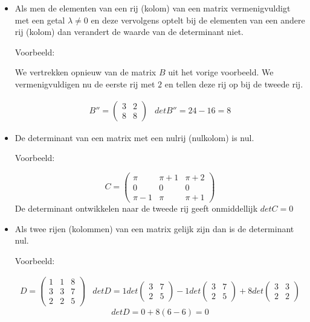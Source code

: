 \begin{itemize}
	\item Als men de elementen van een rij (kolom) van een matrix vermenigvuldigt met een getal $\lambda \neq 0$ en deze vervolgens optelt bij de elementen van een andere rij (kolom) dan verandert de waarde van de determinant niet. 
	
	Voorbeeld:
	
	We vertrekken opnieuw van de matrix $B$ uit het vorige voorbeeld. We vermenigvuldigen nu de eerste rij met $2$ en tellen deze rij op bij de tweede rij.
	
	\[ \begin{array}{ll} B''=\left( \begin{matrix}
	3 & 2 \\ 8 & 8 
	\end{matrix} \right) & det B''=24-16=8 \end{array} \]
	
	\item De determinant van een matrix met een nulrij (nulkolom) is nul.
	
	Voorbeeld:
	
	\[ C=\left( \begin{matrix}
	\pi & \pi+1 & \pi+2 \\ 0 & 0 & 0 \\ \pi-1 & \pi & \pi+1
	\end{matrix} \right) \]
	De determinant ontwikkelen naar de tweede rij geeft onmiddellijk $det C=0$
	
	\item Als twee rijen (kolommen) van een matrix gelijk zijn dan is de determinant nul.
	
	Voorbeeld:
	
	\[ \begin{array}{ll} D=\left( \begin{matrix}
	1 & 1 & 8 \\ 3 & 3 & 7 \\ 2 & 2 & 5
	\end{matrix} \right) & det D=1 det \left( \begin{matrix} 
	3 & 7 \\ 2 & 5 \end{matrix} \right) -1 det \left( \begin{matrix}
	3 & 7 \\ 2 & 5 \end{matrix} \right) + 8 det \left( \begin{matrix} 3 & 3 \\ 2 & 2 \end{matrix} \right) \end{array} \]
	\[ det D = 0 + 8 (6-6) = 0 \]
	

\end{itemize}
